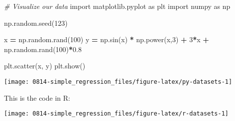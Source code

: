 \documentclass[]{book}
\newenvironment{Shaded}{\begin{snugshade}}{\end{snugshade}}
\newcommand{\CommentTok}[1]{\textcolor[rgb]{0.56,0.35,0.01}{\textit{#1}}}
\newcommand{\DecValTok}[1]{\textcolor[rgb]{0.00,0.00,0.81}{#1}}
\newcommand{\FloatTok}[1]{\textcolor[rgb]{0.00,0.00,0.81}{#1}}
\newcommand{\ImportTok}[1]{#1}
\newcommand{\KeywordTok}[1]{\textcolor[rgb]{0.13,0.29,0.53}{\textbf{#1}}}
\newcommand{\NormalTok}[1]{#1}
\newcommand{\OperatorTok}[1]{\textcolor[rgb]{0.81,0.36,0.00}{\textbf{#1}}}
\newcommand{\StringTok}[1]{\textcolor[rgb]{0.31,0.60,0.02}{#1}}
\begin{document}
\begin{Shaded}
\begin{Highlighting}[]
\CommentTok{# Visualize our data}
\ImportTok{import}\NormalTok{ matplotlib.pyplot }\ImportTok{as}\NormalTok{ plt}
\ImportTok{import}\NormalTok{ numpy }\ImportTok{as}\NormalTok{ np}

\NormalTok{np.random.seed(}\DecValTok{123}\NormalTok{)}

\NormalTok{x }\OperatorTok{=}\NormalTok{ np.random.rand(}\DecValTok{100}\NormalTok{)}
\NormalTok{y }\OperatorTok{=}\NormalTok{ np.sin(x) }\OperatorTok{*}\NormalTok{ np.power(x,}\DecValTok{3}\NormalTok{) }\OperatorTok{+} \DecValTok{3}\OperatorTok{*}\NormalTok{x }\OperatorTok{+}\NormalTok{ np.random.rand(}\DecValTok{100}\NormalTok{)}\OperatorTok{*}\FloatTok{0.8}

\NormalTok{plt.scatter(x, y)}
\NormalTok{plt.show()}
\end{Highlighting}
\end{Shaded}

\texttt{[image: 0814-simple\_regression\_files/figure-latex/py-datasets-1]}

This is the code in R:

\begin{Shaded}
\end{Shaded}

\begin{center}\texttt{[image: 0814-simple\_regression\_files/figure-latex/r-datasets-1]} \end{center}
\end{document}
